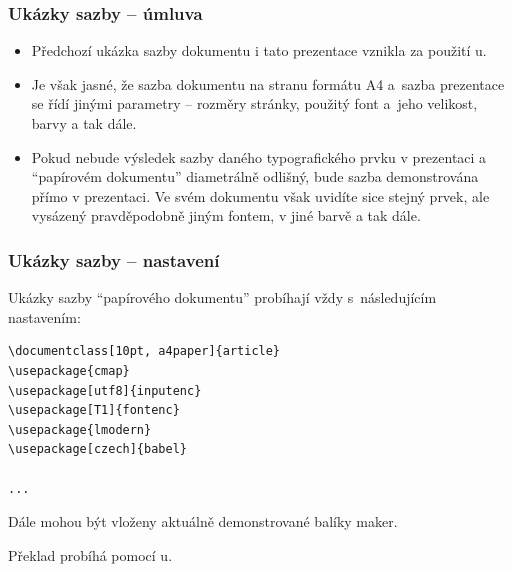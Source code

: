\begin{frame}
	\frametitle{Ukázky sazby -- úmluva}
	\begin{itemize}
		\item Předchozí ukázka sazby dokumentu i tato prezentace vznikla za použití u.
		\item Je však jasné, že sazba dokumentu na stranu formátu A4 a~sazba prezentace se řídí jinými parametry -- rozměry stránky, použitý font a~jeho velikost, barvy a tak dále.
		\item Pokud nebude výsledek sazby daného typografického prvku v prezentaci a \enquote{papírovém dokumentu} diametrálně odlišný, bude sazba demonstrována přímo v prezentaci. Ve svém dokumentu však uvidíte sice stejný prvek, ale vysázený pravděpodobně jiným fontem, v jiné barvě a tak dále.
	\end{itemize}
\end{frame}


\begin{frame}
	\frametitle{Ukázky sazby -- nastavení}
	Ukázky sazby \enquote{papírového dokumentu} probíhají vždy s~následujícím nastavením:\par
	\begin{BVerbatim}
\documentclass[10pt, a4paper]{article}
\usepackage{cmap}
\usepackage[utf8]{inputenc}
\usepackage[T1]{fontenc}
\usepackage{lmodern}
\usepackage[czech]{babel}

...

	\end{BVerbatim}
	\par
	 Dále mohou být vloženy aktuálně demonstrované balíky maker.\par
	 Překlad probíhá pomocí u.
\end{frame}

\endinput
